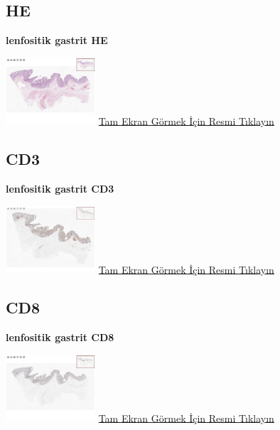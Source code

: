 \documentclass[
  letterpaper,
  DIV=11,
  numbers=noendperiod]{scrreprt}
\begin{document}
\hypertarget{he-8}{%
\subsection{HE}\label{he-8}}

\textbf{lenfositik gastrit HE}

\href{https://images.patolojiatlasi.com/lymphocytic-gastritis/HE.html}{\includegraphics[width=0.25\textwidth,height=\textheight]{./screenshots/lymphocytic-gastritisHE_screenshot.png}}
\href{https://images.patolojiatlasi.com/lymphocytic-gastritis/HE.html}{Tam
Ekran Görmek İçin Resmi Tıklayın}

\hypertarget{cd3}{%
\subsection{CD3}\label{cd3}}

\textbf{lenfositik gastrit CD3}

\href{https://images.patolojiatlasi.com/lymphocytic-gastritis/CD3.html}{\includegraphics[width=0.25\textwidth,height=\textheight]{./screenshots/lymphocytic-gastritisCD3_screenshot.png}}
\href{https://images.patolojiatlasi.com/lymphocytic-gastritis/CD3.html}{Tam
Ekran Görmek İçin Resmi Tıklayın}

\hypertarget{cd8}{%
\subsection{CD8}\label{cd8}}

\textbf{lenfositik gastrit CD8}

\href{https://images.patolojiatlasi.com/lymphocytic-gastritis/CD8.html}{\includegraphics[width=0.25\textwidth,height=\textheight]{./screenshots/lymphocytic-gastritisCD8_screenshot.png}}
\href{https://images.patolojiatlasi.com/lymphocytic-gastritis/CD8.html}{Tam
Ekran Görmek İçin Resmi Tıklayın}
\end{document}
